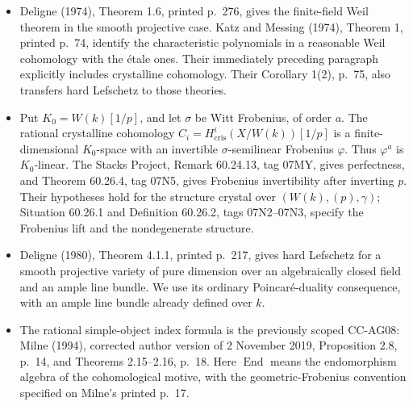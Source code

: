 \begin{itemize}
\tightlist
\item
  Deligne (1974), Theorem 1.6, printed p.~276, gives the finite-field
  Weil theorem in the smooth projective case. Katz and Messing (1974),
  Theorem 1, printed p.~74, identify the characteristic polynomials in a
  reasonable Weil cohomology with the étale ones. Their immediately
  preceding paragraph explicitly includes crystalline cohomology. Their
  Corollary 1(2), p.~75, also transfers hard Lefschetz to those
  theories.
\item
  Put \(K_0=W(k)[1/p]\), and let \(\sigma\) be Witt Frobenius, of order
  \(a\). The rational crystalline cohomology
  \(C_i=H^i_{\mathrm{cris}}(X/W(k))[1/p]\) is a finite-dimensional
  \(K_0\)-space with an invertible \(\sigma\)-semilinear Frobenius
  \(\varphi\). Thus \(\varphi^a\) is \(K_0\)-linear. The Stacks Project,
  Remark 60.24.13, tag 07MY, gives perfectness, and Theorem 60.26.4, tag
  07N5, gives Frobenius invertibility after inverting \(p\). Their
  hypotheses hold for the structure crystal over \((W(k),(p),\gamma)\);
  Situation 60.26.1 and Definition 60.26.2, tags 07N2--07N3, specify the
  Frobenius lift and the nondegenerate structure.
\item
  Deligne (1980), Theorem 4.1.1, printed p.~217, gives hard Lefschetz
  for a smooth projective variety of pure dimension over an
  algebraically closed field and an ample line bundle. We use its
  ordinary Poincaré-duality consequence, with an ample line bundle
  already defined over \(k\).
\item
  The rational simple-object index formula is the previously scoped
  CC-AG08: Milne (1994), corrected author version of 2 November 2019,
  Proposition 2.8, p.~14, and Theorems 2.15--2.16, p.~18. Here
  \(\operatorname{End}\) means the endomorphism algebra of the
  cohomological motive, with the geometric-Frobenius convention
  specified on Milne's printed p.~17.
\end{itemize}

